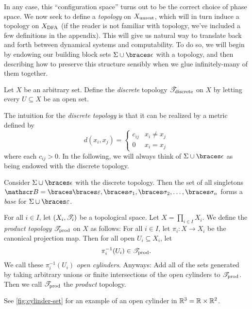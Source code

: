 \documentclass{fkpaper}
\begin{document}
\begin{multicols}{2}
In any case, this ``configuration space'' turns out to be the correct
choice of phase space. We now seek to define a \emph{topology} on
$X_{\rm unrest}$, which will in turn induce a topology on $X_{\rm
  DFA}$ (if the reader is not familiar with topology, we've included a
few definitions in the appendix). This will give us natural way to
translate back and forth between dynamical systems and computability.
To do so, we will begin by endowing our building block sets $\Sigma
\cup \set{\epsilon}$ with a topology, and then describing how to
preserve this structure sensibly when we glue infinitely-many of them
together.
\begin{definition}
  Let $X$ be an arbitrary set. Define the \emph{discrete} topology
  ${\mathscr{T}}_{\rm discrete}$ on $X$ by letting every $U \subseteq X$ be an
  open set.
\end{definition}
The intuition for the \emph{discrete topology} is that it can be
realized by a metric defined by
\[
  d(x_i, x_j) =
  \begin{cases}
    c_{ij} & x_i \neq x_j \\
    0 & x_i = x_j
  \end{cases}
\]
where each $c_{ij} > 0$. In the following, we will always think of
$\Sigma \cup \set{\epsilon}$ as being endowed with the discrete
topology.
\begin{proposition}\label{prop:basis-for-strings}
  Consider $\Sigma \cup \set{\epsilon}$ with the discrete topology.
  Then the set of all singletons $\ms B = \set{\set{\varepsilon},
    \set{\sigma_1}, \set{\sigma_2}, \ldots, \set{\sigma_n}}$ forms a
  \emph{base} for $\Sigma \cup \set{\varepsilon}$.
\end{proposition}

\begin{definition}
  For all $i \in I$, let $(X_i, {\mathscr{T}}_i)$ be a topological space. Let
  $X = \prod_{i \in I} X_i$. We define the \emph{product topology}
  ${\mathscr{T}}_{\rm prod}$ on $X$ as follows: For all $i \in I$, let $\pi_i
  : X \to X_i$ be the canonical projection map. Then for all open $U_i
  \subseteq X_i$, let
  \[
    \pi_i^{-1}(U_i) \in {\mathscr{T}}_{\rm prod}.
  \]
  We call these $\pi_i^{-1}(U_i)$ \emph{open cylinders}. Anyways: Add
  all of the sets generated by taking arbitrary unions or finite
  intersections of the open cylinders to ${\mathscr{T}}_{\rm prod}$. Then we
  call ${\mathscr{T}}_{\rm prod}$ the \emph{product} topology. \qedhere
\end{definition}
See \cref{fig:cylinder-set} for an example of an open cylinder in
$\mathbb{R}^3 = \mathbb{R} \times \mathbb{R}^2$.


\end{multicols}
\end{document}
